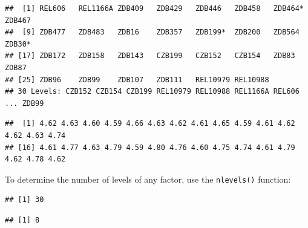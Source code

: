 \documentclass[
]{book}
\newenvironment{Shaded}{\begin{snugshade}}{\end{snugshade}}
\newcommand{\FunctionTok}[1]{\textcolor[rgb]{0.00,0.00,0.00}{#1}}
\newcommand{\NormalTok}[1]{#1}
\newcommand{\SpecialCharTok}[1]{\textcolor[rgb]{0.00,0.00,0.00}{#1}}
\begin{document}
\begin{verbatim}
##  [1] REL606   REL1166A ZDB409   ZDB429   ZDB446   ZDB458   ZDB464*  ZDB467  
##  [9] ZDB477   ZDB483   ZDB16    ZDB357   ZDB199*  ZDB200   ZDB564   ZDB30*  
## [17] ZDB172   ZDB158   ZDB143   CZB199   CZB152   CZB154   ZDB83    ZDB87   
## [25] ZDB96    ZDB99    ZDB107   ZDB111   REL10979 REL10988
## 30 Levels: CZB152 CZB154 CZB199 REL10979 REL10988 REL1166A REL606 ... ZDB99
\end{verbatim}

\begin{Shaded}
\end{Shaded}

\begin{verbatim}
##  [1] 4.62 4.63 4.60 4.59 4.66 4.63 4.62 4.61 4.65 4.59 4.61 4.62 4.62 4.63 4.74
## [16] 4.61 4.77 4.63 4.79 4.59 4.80 4.76 4.60 4.75 4.74 4.61 4.79 4.62 4.78 4.62
\end{verbatim}

To determine the number of levels of any factor, use the \texttt{nlevels()} function:

\begin{Shaded}
\end{Shaded}

\begin{verbatim}
## [1] 30
\end{verbatim}

\begin{Shaded}
\end{Shaded}

\begin{verbatim}
## [1] 8
\end{verbatim}

\begin{Shaded}
\end{Shaded}
\end{document}
